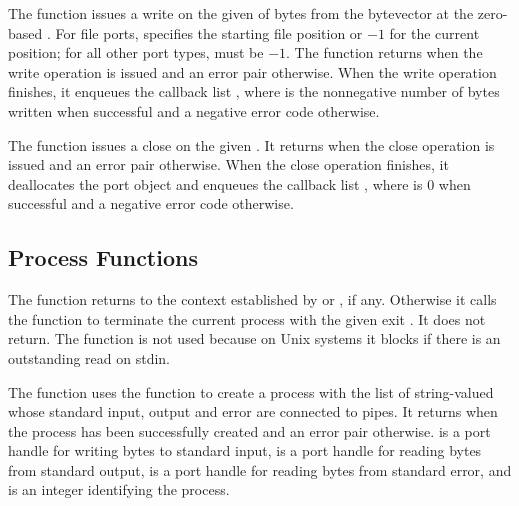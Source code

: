 The  function issues a write on the given
 of  bytes from the bytevector  at the
zero-based . For file ports,  specifies
the starting file position or $-1$ for the current position; for all
other port types,  must be $-1$.  The function returns
 when the write operation is issued and an error pair
otherwise. When the write operation finishes, it enqueues the callback
list , where  is the
nonnegative number of bytes written when successful and a negative
error code otherwise.

\begin{function}
\end{function}

The  function issues a close on the given
. It returns  when the close operation is issued
and an error pair otherwise. When the close operation finishes, it
deallocates the port object and enqueues the callback list
, where  is 0 when
successful and a negative error code otherwise.

\subsection {Process Functions}

\begin{function}
\end{function}

The  function returns  to the context
established by  or , if any.
Otherwise it calls the  function to terminate the current
process with the given exit . It does not return. The
 function is not used because on Unix systems it blocks if
there is an outstanding read on stdin.

\begin{function}
\end{function}

The  function uses the  function to
create a process with the list of string-valued  whose
standard input, output and error are connected to pipes.  It returns
 when the process has been successfully created and an
error pair otherwise.   is a port handle for writing
bytes to standard input,  is a port handle for
reading bytes from standard output,  is a port handle
for reading bytes from standard error, and  is an integer
identifying the process.

